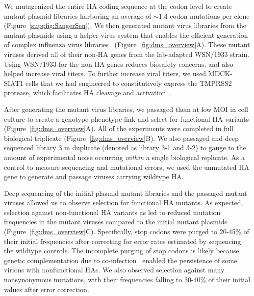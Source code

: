 \documentclass[9pt,twocolumn,twoside]{pnas-new}
\begin{document}
We mutagenized the entire HA coding sequence at the codon level to create mutant plasmid libraries harboring an average of $\sim$1.4 codon mutations per clone (Figure~\ref{suppfig:SangerSeq}).
We then generated mutant virus libraries from the mutant plasmids using a helper-virus system that enables the efficient generation of complex influenza virus libraries~\cite{doud2016accurate} (Figure~\ref{fig:dms_overview}A).
These mutant viruses derived all of their non-HA genes from the lab-adapted WSN/1933 strain.
Using WSN/1933 for the non-HA genes reduces biosafety concerns, and also helped increase viral titers.
To further increase viral titers, we used MDCK-SIAT1 cells that we had engineered to constitutively express the TMPRSS2 protease, which facilitates HA cleavage and activation~\cite{bottcher2006proteolytic, bottcher2010cleavage}.

After generating the mutant virus libraries, we passaged them at low MOI in cell culture to create a genotype-phenotype link and select for functional HA variants (Figure~\ref{fig:dms_overview}A).
All of the experiments were completed in full biological triplicate (Figure~\ref{fig:dms_overview}B). 
We also passaged and deep sequenced library 3 in duplicate (denoted as library 3-1 and 3-2) to gauge to the amount of experimental noise occurring \textit{within} a single biological replicate.
As a control to measure sequencing and mutational errors, we used the unmutated HA gene to generate and passage viruses carrying wildtype HA.

Deep sequencing of the initial plasmid mutant libraries and the passaged mutant viruses allowed us to observe selection for functional HA mutants.
As expected, selection against non-functional HA variants as led to reduced mutation frequencies in the mutant viruses compared to the initial mutant plasmids (Figure~\ref{fig:dms_overview}C).
Specifically, stop codons were purged to 20-45\% of their initial frequencies after correcting for error rates estimated by sequencing the wildtype controls.
The incomplete purging of stop codons is likely because genetic complementation due to co-infection~\cite{marshall2013influenza} enabled the persistence of some virions with nonfunctional HAs. 
We also observed selection against many nonsynonymous mutations, with their frequencies falling to 30-40\% of their initial values after error correction.
\end{document}
